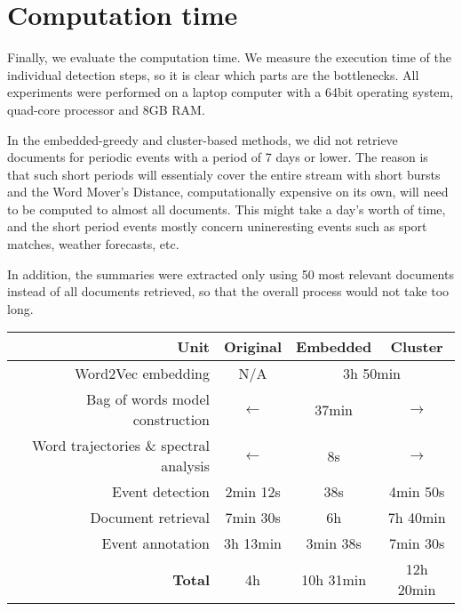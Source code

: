 \section{Computation time}

Finally, we evaluate the computation time. We measure the execution time of the individual detection steps, so it is clear which parts are the bottlenecks. All experiments were performed on a laptop computer with a 64bit operating system, quad-core processor and 8GB RAM.

In the embedded-greedy and cluster-based methods, we did not retrieve documents for periodic events with a period of 7 days or lower. The reason is that such short periods will essentialy cover the entire stream with short bursts and the Word Mover's Distance, computationally expensive on its own, will need to be computed to almost all documents. This might take a day's worth of time, and the short period events mostly concern unineresting events such as sport matches, weather forecasts, etc.

In addition, the summaries were extracted only using 50 most relevant documents instead of all documents retrieved, so that the overall process would not take too long.

\hspace{\fill}

\begin{minipage}{\linewidth}
\centering
\begin{tabular}{ r c c c }\toprule[1.5pt]
\bf Unit & \bf Original & \bf Embedded & \bf Cluster \\ \midrule
Word2Vec embedding & N/A & \multicolumn{2}{c}{3h 50min} \\
Bag of words model construction & $\longleftarrow$ & 37min & $\longrightarrow$ \\
Word trajectories \& spectral analysis & $\longleftarrow$ & 8s & $\longrightarrow$ \\
Event detection & 2min 12s & 38s & 4min 50s \\
Document retrieval & 7min 30s & 6h & 7h 40min \\
Event annotation & 3h 13min & 3min 38s & 7min 30s \\ \midrule
\bf Total & 4h & 10h 31min & 12h 20min\\ \bottomrule[1.25pt]

\end{tabular}\par
{} \label{tab:title}
\end{minipage}

